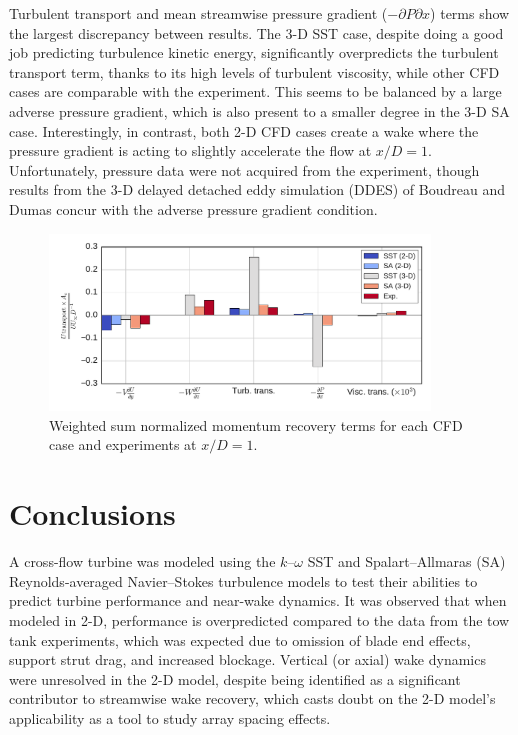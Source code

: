 \documentclass[aip,graphicx]{revtex4-1}
\begin{document}
Turbulent transport and mean streamwise pressure gradient ($-\partial P \partial
x$) terms show the largest discrepancy between results. The 3-D SST case,
despite doing a good job predicting turbulence kinetic energy, significantly
overpredicts the turbulent transport term, thanks to its high levels of
turbulent viscosity, while other CFD cases are comparable with the experiment.
This seems to be balanced by a large adverse pressure gradient, which is also
present to a smaller degree in the 3-D SA case. Interestingly, in contrast, both
2-D CFD cases create a wake where the pressure gradient is acting to slightly
accelerate the flow at $x/D=1$. Unfortunately, pressure data were not acquired
from the experiment, though results from the 3-D delayed detached eddy
simulation (DDES) of Boudreau and Dumas \cite{Boudreau2015} concur with the
adverse pressure gradient condition.

\begin{figure}
    \centering

    \includegraphics[width=0.9\textwidth]{mom_bar_graph}

    \caption{Weighted sum normalized momentum recovery terms for each CFD case
        and experiments\cite{Bachant2016-RVAT-Re-dep} at $x/D=1$.}

    \label{fig:br-cfd-recovery}
\end{figure}


\section{Conclusions}

A cross-flow turbine was modeled using the $k$--$\omega$ SST and
Spalart--Allmaras (SA) Reynolds-averaged Navier--Stokes turbulence models to
test their abilities to predict turbine performance and near-wake dynamics. It
was observed that when modeled in 2-D, performance is overpredicted compared to
the data from the tow tank experiments, which was expected due to omission of
blade end effects, support strut drag, and increased blockage. Vertical (or
axial) wake dynamics were unresolved in the 2-D model, despite being identified
as a significant contributor to streamwise wake recovery, which casts doubt on
the 2-D model's applicability as a tool to study array spacing effects.
\end{document}
